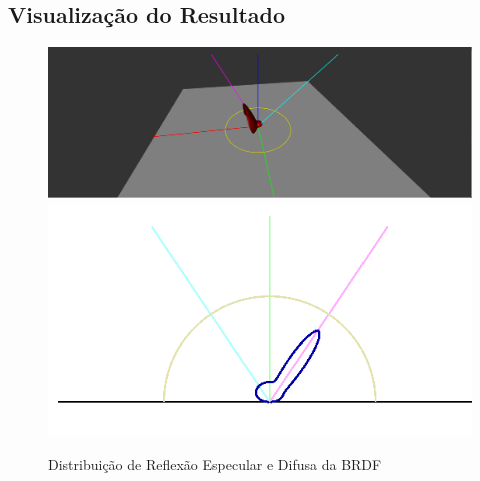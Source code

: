 \subsection{Visualização do Resultado}

\begin{figure}[H]
    \caption{\small{Distribuição de Reflexão Especular e Difusa da BRDF}}\label{fig-ashikhmin-shirley-close-to-original-plots}
    \vspace{42px}
  \includegraphics[width=\linewidth]{./Imagens/brdfs/ashikhmin-shirley-close-to-original-3D-plot}
\endminipage\hfill
{}
  \includegraphics[width=\linewidth]{./Imagens/brdfs/ashikhmin-shirley-close-to-original-polar-plot.png}
\endminipage\hfill
\end{figure}

